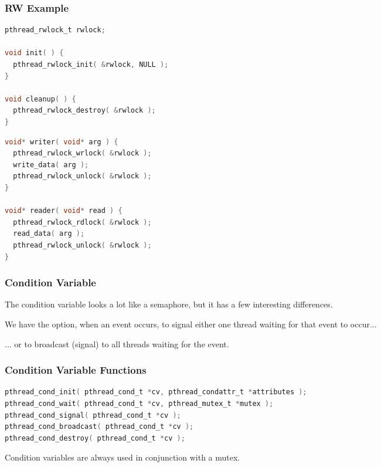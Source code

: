 \begin{frame}[fragile]
\frametitle{RW Example}

\begin{multicols}{2}
	\begin{lstlisting}[language=C]
pthread_rwlock_t rwlock;

void init( ) {
  pthread_rwlock_init( &rwlock, NULL );
}

void cleanup( ) {
  pthread_rwlock_destroy( &rwlock );
}
\end{lstlisting}

	\columnbreak

	\begin{lstlisting}[language=C]
void* writer( void* arg ) {
  pthread_rwlock_wrlock( &rwlock );
  write_data( arg );
  pthread_rwlock_unlock( &rwlock );
}

void* reader( void* read ) {
  pthread_rwlock_rdlock( &rwlock );
  read_data( arg );
  pthread_rwlock_unlock( &rwlock );
}
\end{lstlisting}

\end{multicols}

\end{frame}

\begin{frame}
\frametitle{Condition Variable}

The condition variable looks a lot like a semaphore, but it has a few interesting differences. 

We have the option, when an event occurs, to signal either one thread waiting for that event to occur...

... or to broadcast (signal) to all threads waiting for the event.

\end{frame}

\begin{frame}[fragile]
\frametitle{Condition Variable Functions}

\begin{lstlisting}[language=C]
pthread_cond_init( pthread_cond_t *cv, pthread_condattr_t *attributes );
pthread_cond_wait( pthread_cond_t *cv, pthread_mutex_t *mutex );
pthread_cond_signal( pthread_cond_t *cv );
pthread_cond_broadcast( pthread_cond_t *cv );
pthread_cond_destroy( pthread_cond_t *cv );
\end{lstlisting}

Condition variables are always used in conjunction with a mutex.


\end{frame}

